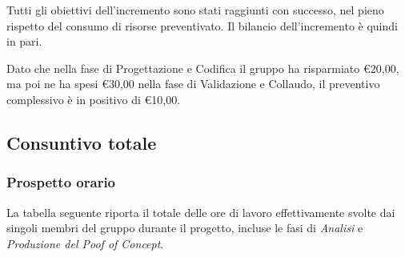 Tutti gli obiettivi dell’incremento sono stati raggiunti con successo, nel pieno rispetto del consumo di risorse preventivato. Il bilancio dell’incremento è quindi in pari.

Dato che nella fase di Progettazione e Codifica il gruppo ha risparmiato \euro20,00, ma poi ne ha spesi \euro30,00 nella fase di Validazione e Collaudo, il preventivo complessivo è in positivo di \euro10,00.


\pagebreak


\subsection{Consuntivo totale}
\subsubsection{Prospetto orario}

La tabella seguente riporta il totale delle ore di lavoro effettivamente svolte dai singoli membri del gruppo durante il progetto, incluse le fasi di \textit{Analisi} e \textit{Produzione del Poof of Concept}.

